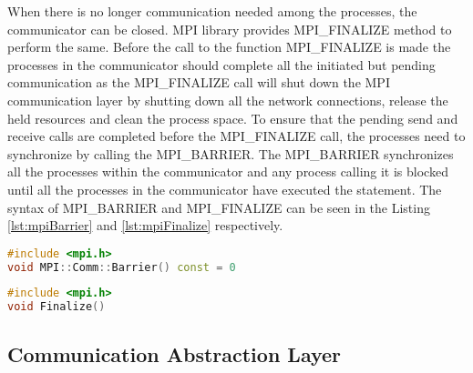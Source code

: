 When there is no longer communication needed among the processes, the communicator can be closed. MPI library provides MPI\_FINALIZE method to perform the same. Before the call to the function MPI\_FINALIZE is made the processes in the communicator should complete all the initiated but pending communication as the MPI\_FINALIZE call will shut down the MPI communication layer by shutting down all the network connections, release the held resources and clean the process space. To ensure that the pending send and receive calls are completed before the MPI\_FINALIZE call, the processes need to synchronize by calling the MPI\_BARRIER. The MPI\_BARRIER synchronizes all the processes within the communicator and any process calling it is blocked until all the processes in the communicator have executed the statement. The syntax of MPI\_BARRIER and MPI\_FINALIZE can be seen in the Listing \ref{lst:mpiBarrier} and \ref{lst:mpiFinalize} respectively.

\begin{lstlisting}[language=C++,label={lst:mpiBarrier},caption={Explicit Synchronization via Barrier}]
#include <mpi.h>
void MPI::Comm::Barrier() const = 0
\end{lstlisting} 

\begin{lstlisting}[language=C++,label={lst:mpiFinalize},caption={Shutting down the MPI environment}]
#include <mpi.h>
void Finalize()
\end{lstlisting} 

\subsection{Communication Abstraction Layer} \label{Absl} 

